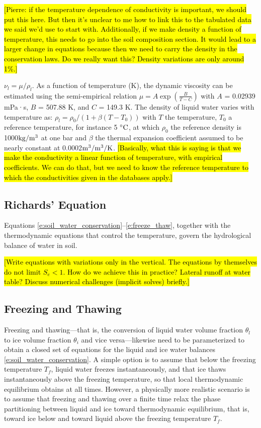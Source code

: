 \documentclass{report}
\begin{document}
\hl{[Pierre: if the temperature dependence of conductivity is important, we should put this here. But then it's unclear to me how to link this to the tabulated data we said we'd use to start with. Additionally, if we make density a function of temperature, this needs to go into the soil composition section. It would lead to a larger change in equations because then we need to carry the density in the conservation laws. Do we really want this? Density variations are only around 1\%.]}

$\nu_l=\mu/\rho_l$. As a function of temperature (K), the dynamic viscosity can be estimated using the semi-empirical relation $\mu = A \exp\left( \frac{B}{T - C} \right) $ with
 $A$ = 0.02939 mPa·s, $B$ = 507.88 K, and $C$ = 149.3 K.
The density of liquid water varies with temperature as:
$\rho_l = \rho_0 / (1 + \beta (T - T_0))   $ with $T$ the temperature, $T_0$ a reference temperature, for instance 5 $ \rm  ^\circ C$, at which $\rho_0$ the reference density is 1000$\rm kg/m^3$ at one bar and $\beta$ the thermal expansion coefficient assumed to be nearly constant at 0.0002$ \rm m^3/m^3 /  K$. \hl{[Basically, what this is saying is that we make the conductivity a linear function of temperature, with empirical coefficients. We can do that, but we need to know the reference temperature to which the conductivities given in the databases apply.]}


\subsection{Richards' Equation}\label{s:water_balance_vertical}

Equations \eqref{e:soil_water_conservation}--\eqref{e:freeze_thaw}, together with the thermodynamic equations that control the temperature, govern the hydrological balance of water in soil.

\hl{[Write equations with variations only in the vertical. The equations by themselves do not limit $S_e<1$. How do we achieve this in practice? Lateral runoff at water table? Discuss numerical challenges (implicit solves) briefly.]}


\subsection{Freezing and Thawing}

Freezing and thawing---that is, the conversion of liquid water volume fraction $\theta_l$ to ice volume fraction $\theta_i$ and vice versa---likewise need to be parameterized to obtain a closed set of equations for the liquid and ice water balances \eqref{e:soil_water_conservation}. A simple option is to assume that below the freezing temperature $T_f$, liquid water freezes instantaneously, and that ice thaws instantaneously above the freezing temperature, so that local thermodynamic equilibrium obtains at all times. However, a physically more realistic scenario is to assume that freezing and thawing over a finite time relax the phase partitioning between liquid and ice toward thermodynamic equilibrium, that is, toward ice below and toward liquid above the freezing temperature $T_f$.
\end{document}
